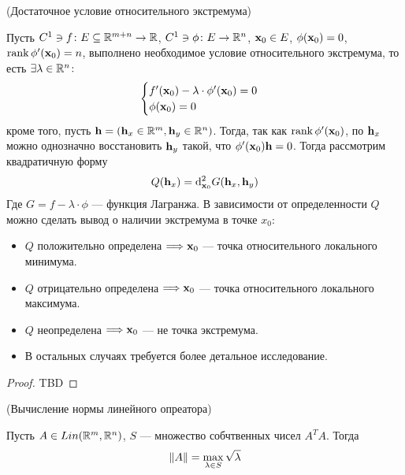 \begin{theorem}(Достаточное условие относительного экстремума)

    Пусть $C^1 \ni f \colon E \subseteq \mathbb{R}^{m + n} \to \mathbb{R}$, $C^1 \ni \phi \colon
    E \to \mathbb{R}^n$, $\mathbf{x}_0 \in E$, $\phi(\mathbf{x}_0) = 0$, $\operatorname{rank}{\phi'(\mathbf{x}_0)} = n$,
    выполнено необходимое условие относительного экстремума, то есть $\exists
    \lambda \in \mathbb{R}^n \colon$
 \[
     \begin{cases}
         f'(\mathbf{x}_0) - \lambda \cdot \phi'(\mathbf{x}_0) = 0 \\
         \phi(\mathbf{x}_0) = 0
     \end{cases}
 \]
    кроме того, пусть $\mathbf{h} = (\mathbf{h}_x \in \mathbb{R}^m, \mathbf{h}_y \in \mathbb{R}^n)$. Тогда, так как
    $\operatorname{rank}{\phi'(\mathbf{x}_0)}$, по $\mathbf{h}_x$ можно однозначно восстановить $\mathbf{h}_y$ такой,
    что $\phi'(\mathbf{x}_0)\mathbf{h} = 0$. Тогда рассмотрим квадратичную форму
\[
    Q(\mathbf{h}_x) = \mathrm{d}^2_{\mathbf{x}_0}{G(\mathbf{h}_x, \mathbf{h}_y)}
\]
    Где $G = f - \lambda \cdot \phi$ --- функция Лагранжа. В зависимости от
    определенности $Q$ можно сделать вывод о наличии экстремума в точке $x_0$:
    \begin{itemize}
        \item $Q$ положительно определена $\Longrightarrow \mathbf{x}_0$ --- точка относительного
        локального минимума.
        \item $Q$ отрицательно определена $\Longrightarrow \mathbf{x}_0$ --- точка относительного
        локального максимума.
        \item $Q$ неопределена $\Longrightarrow \mathbf{x}_0$ --- не точка экстремума.
        \item В остальных случаях требуется более детальное исследование.
    \end{itemize}
\end{theorem}
\begin{proof}
    TBD
\end{proof}

\begin{theorem}(Вычисление нормы линейного опреатора)

    Пусть $A \in Lin(\mathbb{R}^m, \mathbb{R}^n)$, $S$ --- множество собчтвенных чисел $A^T A$.
    Тогда
\[
    \left\lVert A\right\rVert = \max_{\lambda \in S}{\sqrt{\lambda}}
\]
\end{theorem}
